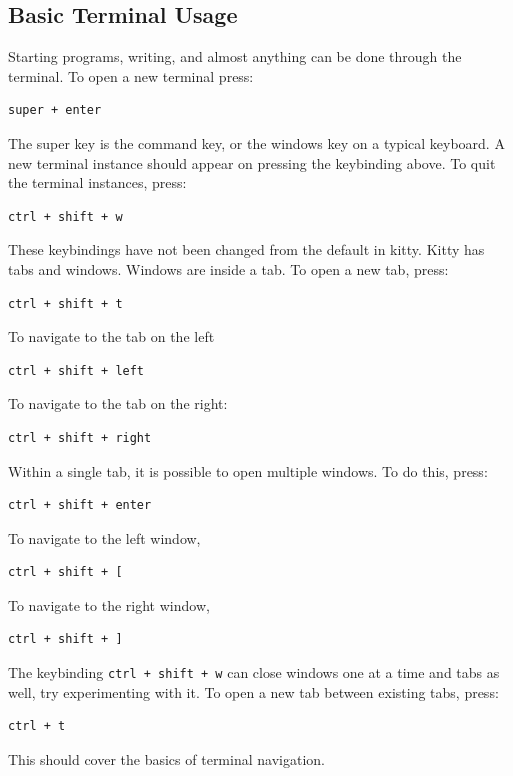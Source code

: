 \documentclass[a4paper, 12pt]{report}
\begin{document}
\begin{center}
\subsection{Basic Terminal Usage}

Starting programs, writing, and almost anything can be done through the terminal. To open a new terminal press:
\begin{lstlisting}
super + enter
\end{lstlisting}
The super key is the command key, or the windows key on a typical keyboard. A new terminal instance should appear on pressing the keybinding above. To quit the terminal instances, press:
\begin{lstlisting}
ctrl + shift + w
\end{lstlisting}
These keybindings have not been changed from the default in kitty. Kitty has tabs and windows. Windows are inside a tab. To open a new tab, press:
\begin{lstlisting}
ctrl + shift + t
\end{lstlisting}
To navigate to the tab on the left
\begin{lstlisting}
ctrl + shift + left
\end{lstlisting}
To navigate to the tab on the right:
\begin{lstlisting}
ctrl + shift + right
\end{lstlisting}
Within a single tab, it is possible to open multiple windows. To do this, press:
\begin{lstlisting}
ctrl + shift + enter
\end{lstlisting}
To navigate to the left window,
\begin{lstlisting}
ctrl + shift + [
\end{lstlisting}
To navigate to the right window,
\begin{lstlisting}
ctrl + shift + ]
\end{lstlisting}
The keybinding \texttt{ctrl + shift + w} can close windows one at a time and tabs as well, try experimenting with it. To open a new tab between existing tabs, press:
\begin{lstlisting}
ctrl + t
\end{lstlisting}
This should cover the basics of terminal navigation.


\end{center}
\end{document}
